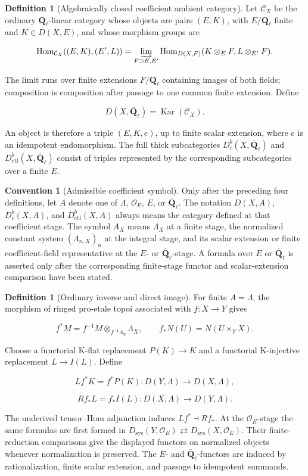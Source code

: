 \documentclass[10pt]{article}
\theoremstyle{definition}
\newtheorem{definition}[theorem]{Definition}
\newtheorem{convention}[theorem]{Convention}
\newcommand{\Ql}{\mathbf Q_\ell}
\newcommand{\Qlb}{\overline{\mathbf Q}_\ell}
\newcommand{\OO}{\mathcal O}
\newcommand{\Dbc}{D^b_c}
\newcommand{\Dctf}{D^b_{\mathrm{ctf}}}
\begin{document}
\begin{definition}[Algebraically closed coefficient ambient category]
Let \(\mathcal C_X\) be the ordinary \(\Ql\)-linear category whose objects
are pairs \((E,K)\), with \(E/\Ql\) finite and \(K\in D(X,E)\), and whose
morphism groups are

\[
 \operatorname{Hom}_{\mathcal C_X}((E,K),(E',L))
 =\varinjlim_{F\supset E,E'}
 \operatorname{Hom}_{D(X,F)}(K\otimes_EF,L\otimes_{E'}F).
\]

The limit runs over finite extensions \(F/\Ql\) containing images of both
fields; composition is composition after passage to one common finite
extension.  Define

\[
 D(X,\Qlb)=\operatorname{Kar}(\mathcal C_X).
\]

An object is therefore a triple \((E,K,e)\), up to finite scalar extension,
where \(e\) is an idempotent endomorphism.  The full thick subcategories
\(\Dbc(X,\Qlb)\) and \(\Dctf(X,\Qlb)\) consist of triples represented by
the corresponding subcategories over a finite \(E\).
\end{definition}

\begin{convention}[Admissible coefficient symbol]
Only after the preceding four definitions, let \(A\) denote one of
\(\Lambda\), \(\OO_E\), \(E\), or \(\Qlb\).  The notation \(D(X,A)\),
\(\Dbc(X,A)\), and \(\Dctf(X,A)\) always means the category defined at
that coefficient stage.  The symbol \(A_X\) means \(\Lambda_X\) at a finite
stage, the normalized constant system \((\Lambda_{n,X})_n\) at the integral
stage, and its scalar extension or finite coefficient-field representative at the
\(E\)- or \(\Qlb\)-stage.  A formula over \(E\) or \(\Qlb\) is asserted only
after the corresponding finite-stage functor and scalar-extension comparison
have been stated.
\end{convention}

\begin{definition}[Ordinary inverse and direct image]
For finite \(A=\Lambda\), the morphism of ringed pro-etale topoi associated
with \(f:X\to Y\) gives

\[
 f^*M=f^{-1}M\otimes_{f^{-1}\Lambda_Y}\Lambda_X,
 \qquad
 f_*N(U)=N(U\times_YX).
\]

Choose a functorial K-flat replacement \(P(K)\to K\) and a functorial
K-injective replacement \(L\to I(L)\).  Define

\[
 Lf^*K=f^*P(K):D(Y,\Lambda)\longrightarrow D(X,\Lambda),
\]

\[
 Rf_*L=f_*I(L):D(X,\Lambda)\longrightarrow D(Y,\Lambda).
\]

The underived tensor--Hom adjunction induces
\(Lf^*\dashv Rf_*\).  At the \(\OO_E\)-stage the same formulas are first
formed in
\(D_{\mathrm{sys}}(Y,\OO_E)\rightleftarrows
D_{\mathrm{sys}}(X,\OO_E)\).  Their finite-reduction comparisons give the
displayed functors on normalized objects whenever normalization is preserved.
The \(E\)- and \(\Qlb\)-functors are induced by rationalization, finite
scalar extension, and passage to idempotent summands.
\end{definition}
\end{document}
